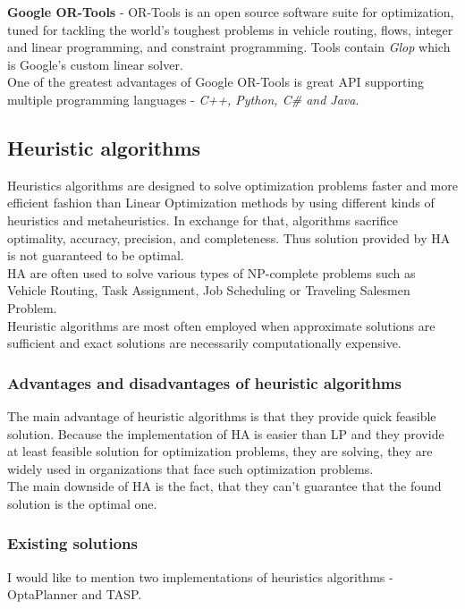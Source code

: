 \textbf{Google OR-Tools} - OR-Tools is an open source software suite for optimization,
tuned for tackling the world's toughest problems in vehicle routing, flows,
integer and linear programming, and constraint programming.\cite{web:googleOrTools}
Tools contain \textit{Glop} which is Google's custom linear solver.\\
One of the greatest advantages of Google OR-Tools is great API supporting multiple programming languages - \textit{C++, Python, C\# and Java}.


\subsection{Heuristic algorithms}\label{subsec:heuristic-algorithms}
Heuristics algorithms are designed to solve optimization problems faster
and more efficient fashion than Linear Optimization methods by using different kinds of heuristics and metaheuristics.
In exchange for that, algorithms sacrifice optimality, accuracy, precision, and completeness.
Thus solution provided by HA is not guaranteed to be optimal.\\
HA are often used to solve various types of NP-complete problems such as
Vehicle Routing, Task Assignment, Job Scheduling or Traveling Salesmen Problem.\\
Heuristic algorithms are most often employed when approximate solutions are sufficient
and exact solutions are necessarily computationally expensive.\cite{papanikolaou2018holistic}

\subsubsection{Advantages and disadvantages of heuristic algorithms}
The main advantage of heuristic algorithms is that they provide quick feasible solution.
Because the implementation of HA is easier than LP and they provide at least feasible solution for optimization problems,
they are solving, they are widely used in organizations that face such optimization problems.\\
The main downside of HA is the fact, that they can't guarantee that the found solution is the optimal one.


\subsubsection{Existing solutions}\label{subsec:existing-solutions-heur}
I would like to mention two implementations of heuristics algorithms - OptaPlanner and TASP\@.\\

